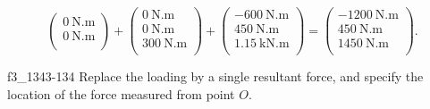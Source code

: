 \begin{derivation}
\begin{equation*}
\begin{pmatrix}
    \qty{0}{\N.\m} \\
    \qty{0}{\N.\m} \\
    \end{pmatrix} + \begin{pmatrix}
      \qty{0}{\N.\m} \\
    \qty{0}{\N.\m} \\
    \qty{300}{\N.\m} \\
    \end{pmatrix} + \begin{pmatrix}
      - \qty{600}{\N.\m} \\
    \qty{450}{\N.\m} \\
    \qty{1.15}{\kN.\m} \\
    \end{pmatrix} = \begin{pmatrix}
      - \qty{1200}{\N.\m} \\
    \qty{450}{\N.\m} \\
    \qty{1450}{\N.\m} \\
    \end{pmatrix}
  .\end{equation*}
\end{derivation}


\begin{problemwithimage}{f3_134}{3-134}
  Replace the loading by a single resultant force, and specify the location of the force measured from point $O$.
\end{problemwithimage}

